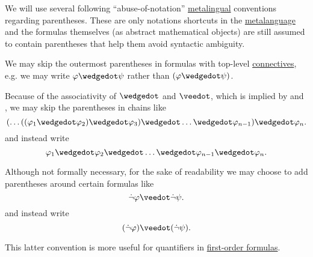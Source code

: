 \begin{remark}\label{rem:propositional_formula_parentheses}
  We will use several following \enquote{abuse-of-notation} \hyperref[con:metalogic]{metalingual} conventions regarding parentheses. These are only notations shortcuts in the \hyperref[con:metalogic]{metalanguage} and the formulas themselves (as abstract mathematical objects) are still assumed to contain parentheses that help them avoid syntactic ambiguity.

  \begin{thmenum}
     We may skip the outermost parentheses in formulas with top-level \hyperref[def:propositional_alphabet/connectives]{connectives}, e.g. we may write \( \varphi \synwedge \psi \) rather than \( (\varphi \synwedge \psi) \).

     Because of the associativity of \( \synwedge \) and \( \synvee \), which is implied by  and , we may skip the parentheses in chains like
    \begin{equation*}
      ( \ldots ((\varphi_1 \synwedge \varphi_2) \synwedge \varphi_3) \synwedge \ldots \synwedge \varphi_{n-1} ) \synwedge \varphi_n.
    \end{equation*}
    and instead write
    \begin{equation*}
      \varphi_1 \synwedge \varphi_2 \synwedge \ldots \synwedge \varphi_{n-1} \synwedge \varphi_n.
    \end{equation*}

     Although not formally necessary, for the sake of readability we may choose to add parentheses around certain formulas like
    \begin{equation*}
      \synneg \varphi \synvee \synneg \psi.
    \end{equation*}
    and instead write
    \begin{equation*}
      (\synneg \varphi) \synvee (\synneg \psi).
    \end{equation*}

    This latter convention is more useful for quantifiers in \hyperref[def:first_order_syntax/formula]{first-order formulas}.
  \end{thmenum}
\end{remark}

